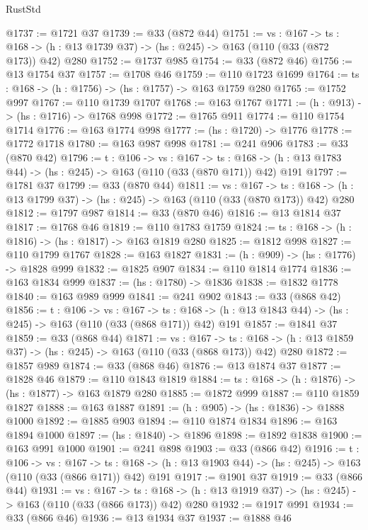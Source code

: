 \begin{lexlean}{RustStd}
\begin{coremodule}
@1737 := @1721 @37
@1739 := @33 (@872 @44)
@1751 := {vs : @167} ->
  {ts : @168} -> (h : @13 @1739 @37) -> (hs : @245) -> @163 (@110 (@33 (@872 @173)) @42) @280
@1752 := @1737 @985
@1754 := @33 (@872 @46)
@1756 := @13 @1754 @37
@1757 := @1708 @46
@1759 := @110 @1723 @1699
@1764 := {ts : @168} -> (h : @1756) -> (hs : @1757) -> @163 @1759 @280
@1765 := @1752 @997
@1767 := @110 @1739 @1707
@1768 := @163 @1767
@1771 := (h : @913) -> (hs : @1716) -> @1768 @998
@1772 := @1765 @911
@1774 := @110 @1754 @1714
@1776 := @163 @1774 @998
@1777 := (hs : @1720) -> @1776
@1778 := @1772 @1718
@1780 := @163 @987 @998
@1781 := @241 @906
@1783 := @33 (@870 @42)
@1796 := {t : @106} ->
  {vs : @167} ->
  {ts : @168} -> (h : @13 @1783 @44) -> (hs : @245) -> @163 (@110 (@33 (@870 @171)) @42) @191
@1797 := @1781 @37
@1799 := @33 (@870 @44)
@1811 := {vs : @167} ->
  {ts : @168} -> (h : @13 @1799 @37) -> (hs : @245) -> @163 (@110 (@33 (@870 @173)) @42) @280
@1812 := @1797 @987
@1814 := @33 (@870 @46)
@1816 := @13 @1814 @37
@1817 := @1768 @46
@1819 := @110 @1783 @1759
@1824 := {ts : @168} -> (h : @1816) -> (hs : @1817) -> @163 @1819 @280
@1825 := @1812 @998
@1827 := @110 @1799 @1767
@1828 := @163 @1827
@1831 := (h : @909) -> (hs : @1776) -> @1828 @999
@1832 := @1825 @907
@1834 := @110 @1814 @1774
@1836 := @163 @1834 @999
@1837 := (hs : @1780) -> @1836
@1838 := @1832 @1778
@1840 := @163 @989 @999
@1841 := @241 @902
@1843 := @33 (@868 @42)
@1856 := {t : @106} ->
  {vs : @167} ->
  {ts : @168} -> (h : @13 @1843 @44) -> (hs : @245) -> @163 (@110 (@33 (@868 @171)) @42) @191
@1857 := @1841 @37
@1859 := @33 (@868 @44)
@1871 := {vs : @167} ->
  {ts : @168} -> (h : @13 @1859 @37) -> (hs : @245) -> @163 (@110 (@33 (@868 @173)) @42) @280
@1872 := @1857 @989
@1874 := @33 (@868 @46)
@1876 := @13 @1874 @37
@1877 := @1828 @46
@1879 := @110 @1843 @1819
@1884 := {ts : @168} -> (h : @1876) -> (hs : @1877) -> @163 @1879 @280
@1885 := @1872 @999
@1887 := @110 @1859 @1827
@1888 := @163 @1887
@1891 := (h : @905) -> (hs : @1836) -> @1888 @1000
@1892 := @1885 @903
@1894 := @110 @1874 @1834
@1896 := @163 @1894 @1000
@1897 := (hs : @1840) -> @1896
@1898 := @1892 @1838
@1900 := @163 @991 @1000
@1901 := @241 @898
@1903 := @33 (@866 @42)
@1916 := {t : @106} ->
  {vs : @167} ->
  {ts : @168} -> (h : @13 @1903 @44) -> (hs : @245) -> @163 (@110 (@33 (@866 @171)) @42) @191
@1917 := @1901 @37
@1919 := @33 (@866 @44)
@1931 := {vs : @167} ->
  {ts : @168} -> (h : @13 @1919 @37) -> (hs : @245) -> @163 (@110 (@33 (@866 @173)) @42) @280
@1932 := @1917 @991
@1934 := @33 (@866 @46)
@1936 := @13 @1934 @37
@1937 := @1888 @46

\end{coremodule}
\end{lexlean}
